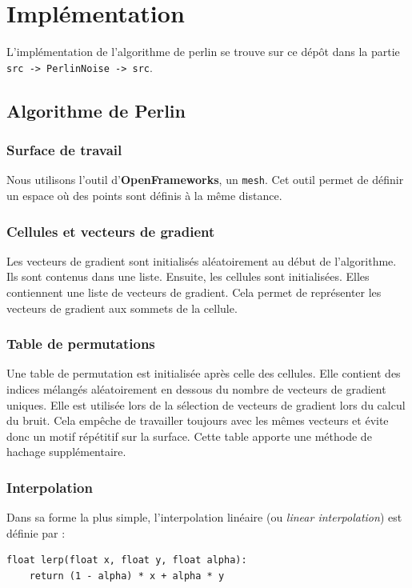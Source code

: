 \section{Implémentation}

L'implémentation de l'algorithme de perlin se trouve sur ce dépôt \cite{Implementation} dans la partie \texttt{src -> PerlinNoise -> src}.

\subsection{Algorithme de Perlin}

\subsubsection{Surface de travail}

Nous utilisons l'outil d'\textbf{OpenFrameworks}, un \texttt{mesh}. 
Cet outil permet de définir un espace où des points sont définis à la même distance.

\subsubsection{Cellules et vecteurs de gradient}

Les vecteurs de gradient sont initialisés aléatoirement au début de l'algorithme. 
Ils sont contenus dans une liste. 
Ensuite, les cellules sont initialisées. 
Elles contiennent une liste de vecteurs de gradient. 
Cela permet de représenter les vecteurs de gradient aux sommets de la cellule. 

\subsubsection{Table de permutations}

Une table de permutation est initialisée après celle des cellules. 
Elle contient des indices mélangés aléatoirement en dessous du nombre de vecteurs de gradient uniques. 
Elle est utilisée lors de la sélection de vecteurs de gradient lors du calcul du bruit. 
Cela empêche de travailler toujours avec les mêmes vecteurs et évite donc un motif répétitif sur la surface. 
Cette table apporte une méthode de hachage supplémentaire. 

\subsubsection{Interpolation}

Dans sa forme la plus simple, l’interpolation linéaire (ou \textit{linear interpolation}) est définie par :
\begin{verbatim}
float lerp(float x, float y, float alpha):
    return (1 - alpha) * x + alpha * y
\end{verbatim}

